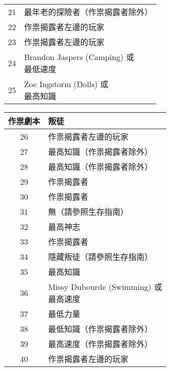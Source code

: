 \begin{center}
\begin{minipage}[t]{.45\textwidth}
\begin{tabular}[t]{ c l }
			21             & 最年老的探險者（作祟揭露者除外）                             \\
			22             & 作祟揭露者左邊的玩家                                   \\
			23             & 作祟揭露者左邊的玩家                                   \\
			24             & \makecell[tl]{Brandon Jaspers (Camping) 或    \\ 最低速度} \\
			25             & \makecell[tl]{Zoe Ingstorm (Dolls) 或         \\ 最高知識} \\
		\end{tabular}
	\end{minipage}\hfil
	\begin{minipage}[t]{.45\textwidth}
		\renewcommand{\arraystretch}{1.5}
		\begin{tabular}[t]{ c l }
			\toprule
			\bfseries 作祟劇本 & \bfseries 叛徒                              \\[.5ex]
			\midrule
			26             & 作祟揭露者左邊的玩家                                \\
			27             & 最高知識（作祟揭露者除外）                             \\
			28             & 最高知識（作祟揭露者除外）                             \\
			29             & 作祟揭露者                                     \\
			30             & 作祟揭露者                                     \\

			31             & 無（請參照生存指南）                                \\
			32             & 最高神志                                      \\
			33             & 作祟揭露者                                     \\
			34             & 隱藏叛徒（請參照生存指南）                             \\
			35             & 最高知識                                      \\

			36             & \makecell[tl]{Missy Dubourde (Swimming) 或 \\ 最高速度} \\
			37             & 最低力量                                      \\
			38             & 最低知識（作祟揭露者除外）                             \\
			39             & 最高速度（作祟揭露者除外）                             \\
			40             & 作祟揭露者左邊的玩家                                \\


\end{tabular}
\end{minipage}
\end{center}
